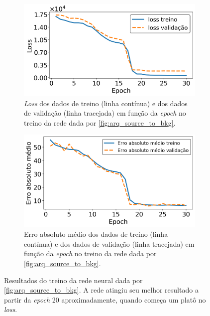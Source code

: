\documentclass[a4paper,12pt,oneside]{book}
\begin{document}
\begin{figure}[H]
\centering
    \begin{subfigure}[t]{0.49\textwidth}
        \centering
        \includegraphics[scale=0.42]{figs/source_to_bkg_loss.png}
        \caption{\textit{Loss} dos dados de treino (linha contínua) e dos dados de validação (linha tracejada) em função da \textit{epoch} no treino da rede dada por \ref{fig:arq_source_to_bkg}.}
        \label{subfig:source_to_bkg_loss}
    \end{subfigure}%
    \hfill
    \begin{subfigure}[t]{0.45\textwidth}
        \centering
        \includegraphics[scale=0.42]{figs/source_to_bkg_metric.png}
        \caption{Erro absoluto médio dos dados de treino (linha contínua) e dos dados de validação (linha tracejada) em função da \textit{epoch} no treino da rede dada por \ref{fig:arq_source_to_bkg}.}
        \label{subfig:source_to_bkg_metric}
    \end{subfigure}
\caption{Resultados do treino da rede neural dada por \ref{fig:arq_source_to_bkg}. A rede atingiu seu melhor resultado a partir da \textit{epoch} 20 aproximadamente, quando começa um 
platô no \textit{loss}.}
\label{fig:source_to_bkg_results}
\end{figure}
\end{document}
